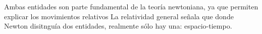 \documentclass[12pt]{article}
\begin{document}

Ambas entidades son parte fundamental de la teoría newtoniana, ya que permiten explicar los movimientos relativos \cite{Maudlin2014Filosofia:7985} La relatividad general señala que donde Newton disitnguía dos entidades, realmente sólo hay una: espacio-tiempo. 







\end{document}
